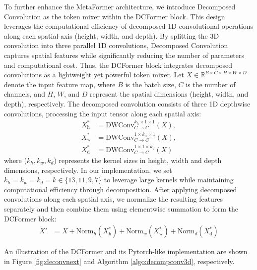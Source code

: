 To further enhance the MetaFormer architecture, we introduce Decomposed Convolution as the token mixer within the DCFormer block. This design leverages the computational efficiency of decomposed 1D convolutional operations along each spatial axis (height, width, and depth). By splitting the 3D convolution into three parallel 1D convolutions, Decomposed Convolution captures spatial features while significantly reducing the number of parameters and computational cost. Thus, the DCFormer block integrates decomposed convolutions as a lightweight yet powerful token mixer. Let \( X \in \mathbb{R}^{B \times C \times H \times W \times D} \) denote the input feature map, where \( B \) is the batch size, \( C \) is the number of channels, and \( H \), \( W \), and \( D \) represent the spatial dimensions (height, width, and depth), respectively. The decomposed convolution consists of three 1D depthwise convolutions, processing the input tensor along each spatial axis:
\begin{align}
X^*_{\text{h}} &= \text{DWConv}^{k_h \times 1 \times 1}_{C \rightarrow C} (X), \\
X^*_{\text{w}} &= \text{DWConv}^{1 \times k_w \times 1}_{C \rightarrow C} (X), \\
X^*_{\text{d}} &= \text{DWConv}^{1 \times 1 \times k_d}_{C \rightarrow C} (X) 
\end{align}
where ($k_h, k_w, k_d$) represents the kernel sizes in height, width and depth dimensions, respectively. In our implementation, we set $k_h = k_w = k_d = k \in \{13, 11, 9, 7\}$ to leverage large kernels while maintaining computational efficiency through decomposition.
After applying decomposed convolutions along each spatial axis, we normalize the resulting features separately and then combine them using elementwise summation to form the DCFormer block: 
\begin{align}
X' &= X + \text{Norm}_h(X^*_{\text{h}}) + \text{Norm}_w(X^*_{\text{w}}) + \text{Norm}_d(X^*_{\text{d}})
\end{align}

An illustration of the DCFormer and its Pytorch-like implementation are shown in Figure \ref{fig:deconvnext} and Algorithm \ref{algo:decompconv3d}, respectively.

